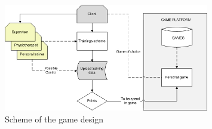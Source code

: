 \documentclass[a4paper,11pt,notitlepage]{report}
\begin{document}
\begin{figure}[H]
	\centering
		\includegraphics[width=0.80\textwidth]{Images/gamedesignscheme.jpg}
	\caption{Scheme of the game design}
	\label{fig:gamedesignscheme}
\end{figure}



%
%
\end{document}
